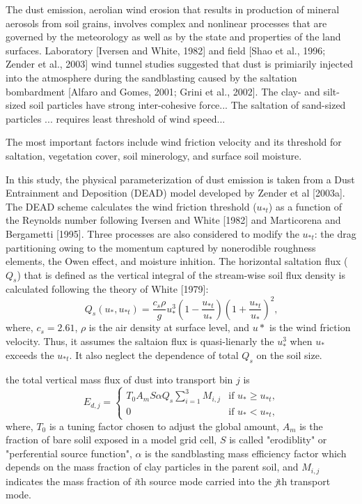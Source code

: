   The dust emission, aerolian wind erosion that results in production of mineral aerosols
  from soil grains, involves complex and nonlinear processes that are governed by the
  meteorology as well as by the state and properties of the land surfaces. Laboratory
  [Iversen and White, 1982] and field [Shao et al., 1996; Zender et al., 2003] wind tunnel
  studies suggested that dust is primiarily injected into the atmosphere during the
  sandblasting caused by the saltation bombardment [Alfaro and Gomes, 2001; Grini et al.,
  2002]. The clay- and silt-sized soil particles have strong inter-cohesive force...
  The saltation of sand-sized particles ... requires least threshold of wind speed...


  The most important factors include wind friction velocity and its threshold for
  saltation, vegetation cover, soil minerology, and surface soil moisture.

  In this study, the physical parameterization of dust emission is taken from a Dust
  Entrainment and Deposition (DEAD) model developed by Zender et al [2003a]. The DEAD scheme
  calculates the wind friction threshold ($u_{*t}$) as a function of the Reynolds number
  following Iversen and White [1982] and Marticorena and Bergametti [1995]. Three processes
  are also considered to modify the $u_{*t}$: the drag partitioning owing to the momentum
  captured by nonerodible roughness elements, the Owen effect, and moisture inhition. The
  horizontal saltation flux ($Q_s$) that is defined as the vertical integral of the
  stream-wise soil flux density is calculated following the theory of White [1979]:
  \begin{equation}
  Q_s(u_*,u_{*t}) = \frac{c_s \rho}{g} u_*^3
        \left(1-\frac{u_{*t}}{u_*}\right)
        \left(1+\frac{u_{*t}}{u_*}\right)^2 \mbox{,}
  \end{equation}
  where, $c_s=2.61$, $\rho$ is the air density at surface level, and $u*$ is the wind
  friction velocity. Thus, it assumes the saltaion flux is quasi-lienarly the $u_*^3$ when
  $u_*$ exceeds the $u_{*t}$. It also neglect the dependence of total $Q_s$ on the soil size.

  the total
   vertical mass flux of dust into transport bin $j$ is
   \begin{equation} \label{eq:Ed}
   E_{d,j} = 
     \begin{cases} T_0 A_m S \alpha Q_s
                   \displaystyle \sum_{i=1}^3 M_{i,j} & \mbox{if $u_* \geq u_{*t}$,} \\
                   0 & \mbox{if $u_* < u_{*t}$,}
     \end{cases}
   \end{equation}
   where, $T_0$ is a tuning factor chosen to adjust the global amount, $A_m$ is the fraction
   of bare solil exposed in a model grid cell, $S$ is called "erodiblity" or "perferential
   source function", $\alpha$ is the sandblasting mass efficiency factor which depends on the
   mass fraction of clay particles in the parent soil, and $M_{i,j}$ indicates the mass
   fraction of \textit{i}th source mode carried into the \textit{j}th transport mode.

